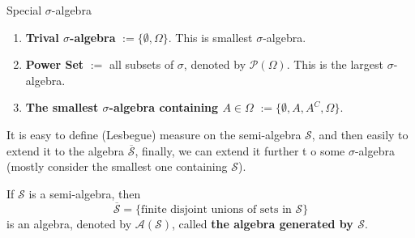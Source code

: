 
    

\begin{example}{Special $\sigma$-algebra}{}
    \begin{enumerate}
        \item \textbf{Trival $\sigma$-algebra} $:=\{\emptyset,\Omega\}$. This is smallest $\sigma$-algebra.
        \item \textbf{Power Set} $:=$ all subsets of $\sigma$, denoted by $\mathcal{P}(\Omega)$. This is the largest $\sigma$-algebra.
        \item \textbf{The smallest $\sigma$-algebra containing $A\in\Omega$} $:=\{\emptyset,A,A^C,\Omega\}$.
    \end{enumerate}
\end{example}

It is easy to define (Lesbegue) measure on the semi-algebra  $\mathcal{S}$, and then easily to extend it to the algebra $\overline{\mathcal{S}}$, finally, we can extend it further t o some $\sigma$-algebra (mostly consider the smallest one containing $\mathcal{S}$).

\begin{lemma}{}{}
    If $\mathcal{S}$ is a semi-algebra, then $$\overline{\mathcal{S}}=\{\text{finite disjoint unions of sets in }\mathcal{S}\}$$ is an algebra, denoted by $\mathcal{A}(\mathcal{S})$, called \textbf{the algebra generated by $\mathcal{S}$}.
\end{lemma}

